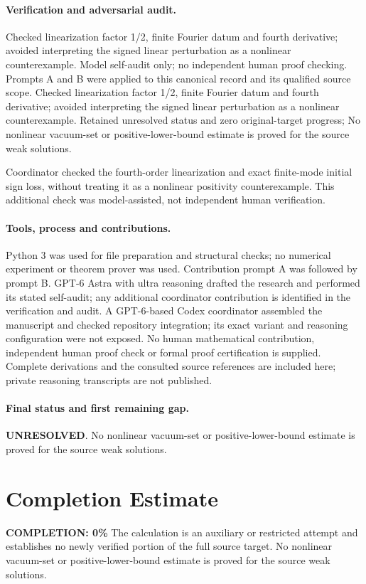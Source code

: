 \documentclass[11pt]{article}
\begin{document}
\paragraph{Verification and adversarial audit.}
Checked linearization factor 1/2, finite Fourier datum and fourth derivative; avoided interpreting the signed linear perturbation as a nonlinear counterexample. Model self-audit only; no independent human proof checking. Prompts A and B were applied to this canonical record and its qualified source scope. Checked linearization factor 1/2, finite Fourier datum and fourth derivative; avoided interpreting the signed linear perturbation as a nonlinear counterexample. Retained unresolved status and zero original-target progress; No nonlinear vacuum-set or positive-lower-bound estimate is proved for the source weak solutions.

Coordinator checked the fourth-order linearization and exact finite-mode initial sign loss, without treating it as a nonlinear positivity counterexample. This additional check was model-assisted, not independent human verification.

\paragraph{Tools, process and contributions.}
Python 3 was used for file preparation and structural checks; no numerical experiment or theorem prover was used. Contribution prompt A was followed by prompt B. GPT-6 Astra with ultra reasoning drafted the research and performed its stated self-audit; any additional coordinator contribution is identified in the verification and audit. A GPT-6-based Codex coordinator assembled the manuscript and checked repository integration; its exact variant and reasoning configuration were not exposed. No human mathematical contribution, independent human proof check or formal proof certification is supplied. Complete derivations and the consulted source references are included here; private reasoning transcripts are not published.

\paragraph{Final status and first remaining gap.}
\textbf{UNRESOLVED}. No nonlinear vacuum-set or positive-lower-bound estimate is proved for the source weak solutions.

\section{Completion Estimate}
\noindent\textbf{COMPLETION: 0\%}
The calculation is an auxiliary or restricted attempt and establishes no newly verified portion of the full source target. No nonlinear vacuum-set or positive-lower-bound estimate is proved for the source weak solutions.
\end{document}
